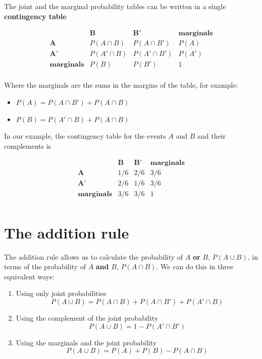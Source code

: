 \documentclass[
]{book}
\providecommand{\tightlist}{%
  \setlength{\itemsep}{0pt}\setlength{\parskip}{0pt}}
\begin{document}
The joint and the marginal probability tables can be written in a single \textbf{contingency table}

\[
\begin{array}{ccc|c}
           & \mathbf{B}             & \mathbf{B'}             & \mathbf{marginals} \\ 
\mathbf{A}        & P(A \cap B)   & P(A \cap B')   & P(A)       \\ 
\mathbf{A'}       & P(A' \cap B)  & P(A' \cap B')  & P(A')      \\ \hline
\mathbf{marginals} & P(B)        & P(B')         & 1            \\ 
\end{array}
\]

Where the marginals are the sums in the margins of the table, for example:

\begin{itemize}
\tightlist
\item
  \(P(A)=P(A \cap B') + P(A \cap B)\)
\item
  \(P(B)=P(A' \cap B) + P(A \cap B)\)
\end{itemize}

In our example, the contingency table for the events \(A\) and \(B\) and their complements is

\[
\begin{array}{ccc|c}
           & \mathbf{B}             & \mathbf{B'}             & \mathbf{marginals} \\ 
\mathbf{A}        & 1/6   & 2/6   & 3/6       \\ 
\mathbf{A'}       & 2/6  & 1/6   & 3/6     \\ \hline
\mathbf{marginals} & 3/6        & 3/6         & 1            \\ 
\end{array}
\]

\hypertarget{the-addition-rule}{%
\section{The addition rule}\label{the-addition-rule}}

The addition rule allows us to calculate the probability of \(A\) \textbf{or} \(B\), \(P( A \cup B)\), in terms of the probability of \(A\) \textbf{and} \(B\), \(P(A \cap B )\). We can do this in three equivalent ways:

\begin{enumerate}
\def\labelenumi{\arabic{enumi})}
\item
  Using only joint probabilities
  \[P( A \cup B)=P(A \cap B)+P(A\cap B')+P(A'\cap B)\]
\item
  Using the complement of the joint probability
  \[P(A \cup B)=1-P(A'\cap B')\]
\item
  Using the marginals and the joint probability
  \[P(A \cup B)=P(A) + P(B) - P(A\cap B)\]
\end{enumerate}
\end{document}
